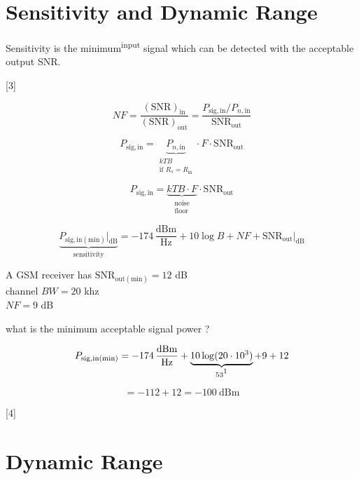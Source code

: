 \documentclass[11pt,a4paper]{article}
\begin{document}
\section{Sensitivity and Dynamic Range}

Sensitivity is the minimum\textsuperscript{input} signal which can be detected with the acceptable output SNR.

[3]

\[ NF = \frac{(\mathrm{SNR})_{\mathrm{in}}}{(\mathrm{SNR})_{\mathrm{out}}} = \frac{P_{\mathrm{sig,in}}/P_{n,\mathrm{in}}}{\mathrm{SNR}_{\mathrm{out}}} \]

\[ P_{\mathrm{sig,in}} = \underbrace{P_{n,\mathrm{in}}}_{\substack{kTB\\ \text{if } R_s = R_{\mathrm{in}}}}\cdot F\cdot \mathrm{SNR}_{\mathrm{out}} \]

\[ P_{\mathrm{sig,in}} = \underbrace{kTB\cdot F}_{\substack{\text{noise}\\ \text{floor}}}\cdot \mathrm{SNR}_{\mathrm{out}} \]


\[ \underbrace{P_{\mathrm{sig,in(min)}}\Big|_{\mathrm{dB}}}_{\text{sensitivity}} = -174\,\frac{\mathrm{dBm}}{\mathrm{Hz}} + 10\log B + NF + \mathrm{SNR}_{\mathrm{out}}\Big|_{\mathrm{dB}} \]

\begin{ornek}
A GSM receiver has $\mathrm{SNR}_{\mathrm{out(min)}} = 12$ dB \\
channel $BW = 20$ khz \\
$NF = 9$ dB

what is the minimum acceptable signal power ?
\end{ornek}

\[ P_{\mathrm{sig,in(min)}} = -174\,\frac{\mathrm{dBm}}{\mathrm{Hz}} + \underbrace{10\log(20\cdot 10^3)}_{53\footnotemark} + 9 + 12 \]

\[ = -112 + 12 = -100\ \mathrm{dBm} \]

[4]

\section{Dynamic Range}
\end{document}
